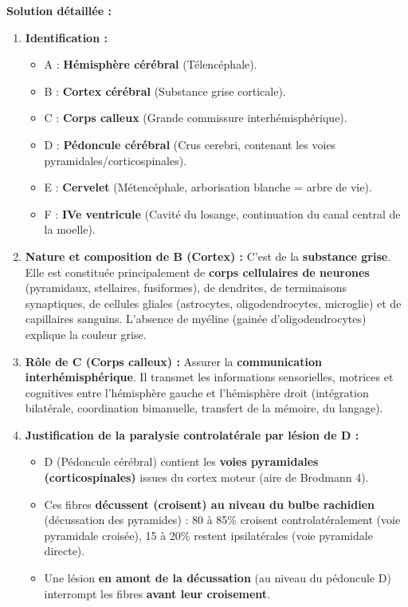 \documentclass[11pt]{article}
\begin{document}
\begin{exoresolu}
\tcblower
\textbf{Solution détaillée :}
\begin{enumerate}
    \item \textbf{Identification :}
    \begin{itemize}
        \item A : \textbf{Hémisphère cérébral} (Télencéphale).
        \item B : \textbf{Cortex cérébral} (Substance grise corticale).
        \item C : \textbf{Corps calleux} (Grande commissure interhémisphérique).
        \item D : \textbf{Pédoncule cérébral} (Crus cerebri, contenant les voies pyramidales/corticospinales).
        \item E : \textbf{Cervelet} (Métencéphale, arborisation blanche = arbre de vie).
        \item F : \textbf{IVe ventricule} (Cavité du losange, continuation du canal central de la moelle).
    \end{itemize}
    \item \textbf{Nature et composition de B (Cortex) :} C'est de la \textbf{substance grise}. Elle est constituée principalement de \textbf{corps cellulaires de neurones} (pyramidaux, stellaires, fusiformes), de dendrites, de terminaisons synaptiques, de cellules gliales (astrocytes, oligodendrocytes, microglie) et de capillaires sanguins. L'absence de myéline (gainée d'oligodendrocytes) explique la couleur grise.
    \item \textbf{Rôle de C (Corps calleux) :} Assurer la \textbf{communication interhémisphérique}. Il transmet les informations sensorielles, motrices et cognitives entre l'hémisphère gauche et l'hémisphère droit (intégration bilatérale, coordination bimanuelle, transfert de la mémoire, du langage).
    \item \textbf{Justification de la paralysie controlatérale par lésion de D :}
    \begin{itemize}
        \item D (Pédoncule cérébral) contient les \textbf{voies pyramidales (corticospinales)} issues du cortex moteur (aire de Brodmann 4).
        \item Ces fibres \textbf{décussent (croisent) au niveau du bulbe rachidien} (décussation des pyramides) : 80 à 85\% croisent controlatéralement (voie pyramidale croisée), 15 à 20\% restent ipsilatérales (voie pyramidale directe).
        \item Une lésion \textbf{en amont de la décussation} (au niveau du pédoncule D) interrompt les fibres \textbf{avant leur croisement}.

\end{itemize}
\end{enumerate}
\end{exoresolu}
\end{document}
